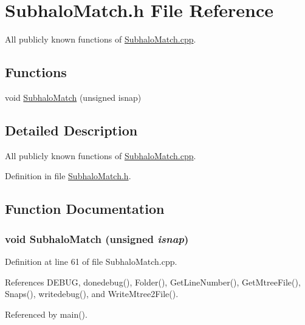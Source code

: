 \section{SubhaloMatch.h File Reference}
\label{SubhaloMatch_8h}


All publicly known functions of \hyperlink{SubhaloMatch_8cpp}{SubhaloMatch.cpp}.  


\subsection*{Functions}
\begin{DoxyCompactItemize}
\item 
void \hyperlink{SubhaloMatch_8h_a3d5bcfb515b1e1099036e4e60a70dccb}{SubhaloMatch} (unsigned isnap)
\end{DoxyCompactItemize}


\subsection{Detailed Description}
All publicly known functions of \hyperlink{SubhaloMatch_8cpp}{SubhaloMatch.cpp}. 

Definition in file \hyperlink{SubhaloMatch_8h_source}{SubhaloMatch.h}.



\subsection{Function Documentation}
\subsubsection[{SubhaloMatch}]{\setlength{\rightskip}{0pt plus 5cm}void SubhaloMatch (unsigned {\em isnap})}\label{SubhaloMatch_8h_a3d5bcfb515b1e1099036e4e60a70dccb}


Definition at line 61 of file SubhaloMatch.cpp.



References DEBUG, donedebug(), Folder(), GetLineNumber(), GetMtreeFile(), Snaps(), writedebug(), and WriteMtree2File().



Referenced by main().

